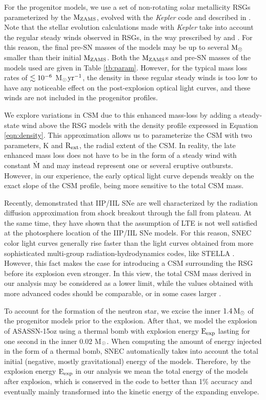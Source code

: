 \documentclass[a4paper,fleqn,usenatbib]{mnras}
\newcommand{\msunperiod}{M$\rm{_{\odot}}$}
\begin{document}
For the progenitor models, we use a set of non-rotating solar metallicity RSGs parameterized by the $\rm{M_{ZAMS}}$, evolved with the {\it Kepler} code and described in \citet{2016sukhbold}.
Note that the stellar evolution calculations made with {\it Kepler} take into account the regular steady winds observed in RSGs, in the way prescribed by \citet{1990nieuwenhuijzen} and \citet{1999wellstein}.
For this reason, the final pre-SN masses of the models may be up to several $\rm{M_{\odot}}$ smaller than their initial $\rm{M_{ZAMS}}$.
Both the $\rm{M_{ZAMS}}$s and pre-SN masses of the models used are given in Table \ref{tb:param}.
However, for the typical mass loss rates of $\rm{\lesssim10^{-6}}$ \msunperiod $\rm{yr^{-1}}$,  the density in these regular steady winds is too low to have any noticeable effect on the post-explosion optical light curves, and these winds are not included in the progenitor profiles. 

We explore variations in CSM due to this enhanced mass-loss by adding a steady-state wind above the RSG models with the density profile expressed in Equation \ref{eqn:density}.
This approximation allows us to parameterize the CSM with two parameters, K and $\rm{R_{ext}}$, the radial extent of the CSM.
In reality, the late enhanced mass loss does not have to be in the form of a steady wind with constant $\rm{\dot{M}}$ and may instead represent one or several eruptive outbursts. However, in our experience, the early optical light curve depends weakly on the exact slope of the CSM profile, being more sensitive to the total CSM mass.

Recently, \citet{2018paxton} demonstrated that IIP/IIL SNe are well characterized by the radiation diffusion approximation from shock breakout through the fall from plateau.
At the same time, they have shown that the assumption of LTE is not well satisfied at the photosphere location of the IIP/IIL SNe models. 
For this reason, SNEC color light curves generally rise faster than the light curves obtained from more sophisticated multi-group radiation-hydrodynamics codes, like STELLA \citep{2018paxton}. 
However, this fact makes the case for introducing a CSM surrounding the RSG before its explosion even stronger.
In this view, the total CSM mass derived in our analysis may be considered as a lower limit, while the values obtained with more advanced codes should be comparable, or in some cases larger \citep{2017moriya,2018paxton}.

To account for the formation of the neutron star, we excise the inner $\rm{1.4\,M_{\odot}}$ of the progenitor models prior to the explosion. 
After that, we model the explosion of ASASSN-15oz using a thermal bomb with explosion energy $\rm{E_{exp}}$ lasting for one second in the inner 0.02 \msunperiod. 
When computing the amount of energy injected in the form of a thermal bomb, SNEC automatically takes into account the total initial (negative, mostly gravitational) energy of the models. 
Therefore, by the explosion energy $\rm{E_{exp}}$ in our analysis we mean the total energy of the models after explosion, which is conserved in the code to better than 1\% accuracy and eventually mainly transformed into the kinetic energy of the expanding envelope.
\end{document}
